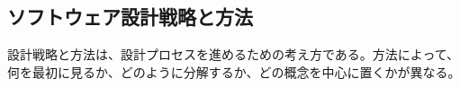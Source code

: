 \subsection{ソフトウェア設計戦略と方法}

設計戦略と方法は、設計プロセスを進めるための考え方である。方法によって、何を最初に見るか、どのように分解するか、どの概念を中心に置くかが異なる。
